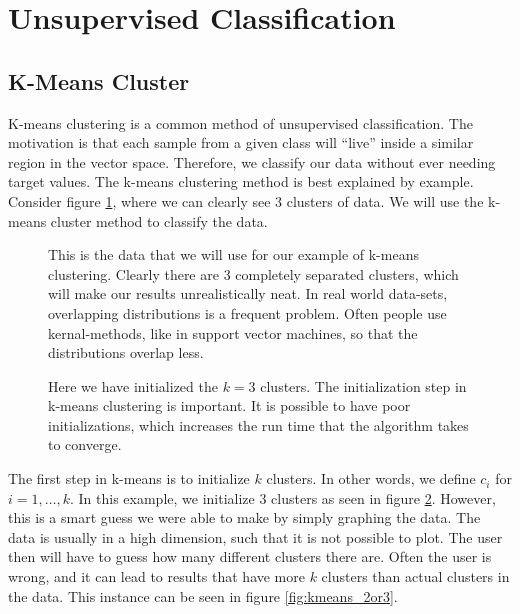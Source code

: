 \message{ !name(main.tex)}\documentclass[11pt]{article}
\begin{document}
\section{Unsupervised Classification}
\subsection{K-Means Cluster}
K-means clustering is a common method of unsupervised classification. The motivation is that each sample from a given class will ``live'' inside a similar region in the vector space. Therefore, we classify our data without ever needing target values. The k-means clustering method is best explained by example. Consider figure \ref{fig:kmeans_data}, where we can clearly see $3$ clusters of data. We will use the k-means cluster method to classify the data.

\begin{minipage}{0.47\linewidth}
  \begin{figure}[H]
    \centering
    
    \caption{This is the data that we will use for our example of k-means clustering. Clearly there are $3$ completely separated clusters, which will make our results unrealistically neat. In real world data-sets, overlapping distributions is a frequent problem. Often people use kernal-methods, like in support vector machines, so that the distributions overlap less.}
    \label{fig:kmeans_data}
  \end{figure}
\end{minipage}\hfill
\begin{minipage}{0.47\linewidth}
  \begin{figure}[H]
    \centering
    
    \caption{Here we have initialized the $k = 3$ clusters. The initialization step in k-means clustering is important. It is possible to have poor initializations, which increases the run time that the algorithm takes to converge.}
    \label{fig:kmeans_init}
  \end{figure}
\end{minipage}\vspace{0.5cm}

The first step in k-means is to initialize $k$ clusters. In other words, we define $c_{i}$ for $i = 1,\ldots,k$. In this example, we initialize $3$ clusters as seen in figure \ref{fig:kmeans_init}. However, this is a smart guess we were able to make by simply graphing the data. The data is usually in a high dimension, such that it is not possible to plot. The user then will have to guess how many different clusters there are. Often the user is wrong, and it can lead to results that have more $k$ clusters than actual clusters in the data. This instance can be seen in figure \ref{fig:kmeans_2or3}.
\end{document}
